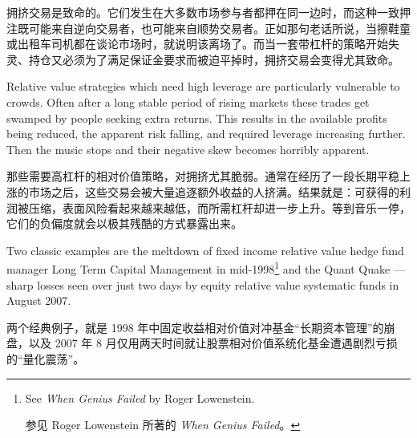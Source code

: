 \begin{chineseblock}拥挤交易是致命的。它们发生在大多数市场参与者都押在同一边时，而这种一致押注既可能来自逆向交易者，也可能来自顺势交易者。正如那句老话所说，当擦鞋童或出租车司机都在谈论市场时，就说明该离场了。而当一套带杠杆的策略开始失灵、持仓又必须为了满足保证金要求而被迫平掉时，拥挤交易会变得尤其致命。\end{chineseblock}

\bipairgap

\begin{englishblock} Relative value strategies which need high leverage are particularly vulnerable to crowds. Often after a long stable period of rising markets these trades get swamped by people seeking extra returns. This results in the available profits being reduced, the apparent risk falling, and required leverage increasing further. Then the music stops and their negative skew becomes horribly apparent. \end{englishblock}

\begin{chineseblock}那些需要高杠杆的相对价值策略，对拥挤尤其脆弱。通常在经历了一段长期平稳上涨的市场之后，这些交易会被大量追逐额外收益的人挤满。结果就是：可获得的利润被压缩，表面风险看起来越来越低，而所需杠杆却进一步上升。等到音乐一停，它们的负偏度就会以极其残酷的方式暴露出来。\end{chineseblock}

\bipairgap

\begin{englishblock} Two classic examples are the meltdown of fixed income relative value hedge fund manager Long Term Capital Management in mid-1998\footnote{See \textit{When Genius Failed} by Roger Lowenstein. \par 参见 Roger Lowenstein 所著的 \textit{When Genius Failed}。} and the Quant Quake --- sharp losses seen over just two days by equity relative value systematic funds in August 2007. \end{englishblock}

\begin{chineseblock}两个经典例子，就是 1998 年中固定收益相对价值对冲基金“长期资本管理”的崩盘，以及 2007 年 8 月仅用两天时间就让股票相对价值系统化基金遭遇剧烈亏损的“量化震荡”。\end{chineseblock}



